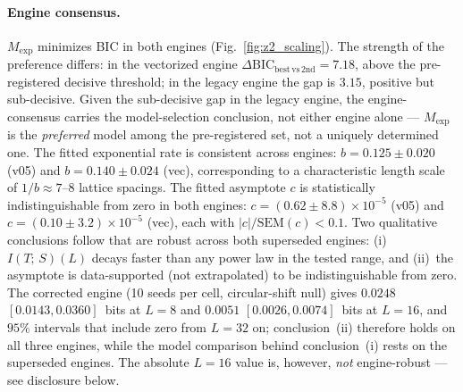 \documentclass[aps,pra,twocolumn,superscriptaddress,showpacs,floatfix]{revtex4-2}
\newcommand{\MI}{I(T;\,S)}
\begin{document}
\paragraph{Engine consensus.}
$M_\mathrm{exp}$ minimizes BIC in both engines (Fig.~\ref{fig:z2_scaling}). The strength of the preference
differs: in the vectorized engine
$\Delta\mathrm{BIC}_\mathrm{best\,vs\,2nd} = 7.18$, above the pre-registered
decisive threshold; in the legacy engine the gap is $3.15$, positive but
sub-decisive. Given the sub-decisive gap in the legacy engine, the
engine-consensus carries the model-selection conclusion, not either engine
alone --- $M_\mathrm{exp}$ is the \emph{preferred} model among the
pre-registered set, not a uniquely determined one. The fitted exponential rate
is consistent across engines: $b = 0.125 \pm 0.020$ (v05) and
$b = 0.140 \pm 0.024$ (vec), corresponding to a characteristic length scale of
$1/b \approx 7$--$8$ lattice spacings. The fitted asymptote $c$ is statistically
indistinguishable from zero in both engines:
$c = (0.62 \pm 8.8) \times 10^{-5}$ (v05) and
$c = (0.10 \pm 3.2) \times 10^{-5}$ (vec), each with
$|c|/\mathrm{SEM}(c) < 0.1$. Two qualitative conclusions follow that are
robust across both superseded engines: (i)~$\MI(L)$ decays faster than any power law
in the tested range, and (ii)~the asymptote is data-supported (not
extrapolated) to be indistinguishable from zero. The corrected engine (10 seeds per cell, circular-shift null) gives $0.0248$ $[0.0143, 0.0360]$~bits at $L = 8$ and $0.0051$ $[0.0026, 0.0074]$~bits at $L = 16$, and $95\%$ intervals that include zero from $L = 32$ on; conclusion~(ii) therefore holds on all three engines, while the model comparison behind conclusion~(i) rests on the superseded engines. The absolute $L=16$ value
is, however, \emph{not} engine-robust --- see disclosure below.
\end{document}
